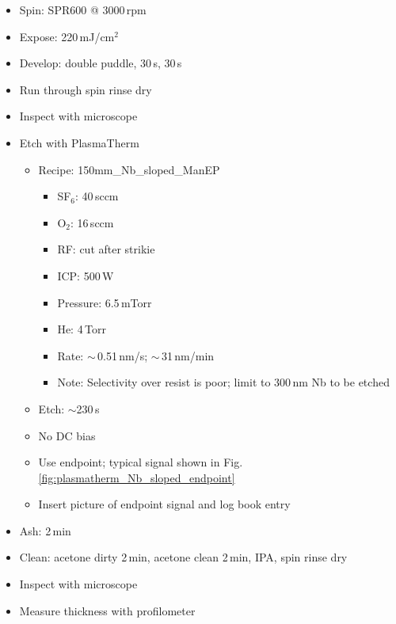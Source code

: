 \begin{itemize}
\item Spin: SPR600 @ 3000\,rpm
\item Expose: 220\,mJ/cm$^2$
\item Develop: double puddle, 30\,s, 30\,s
\item Run through spin rinse dry
\item Inspect with microscope
\item Etch with PlasmaTherm
\begin{itemize}
\item Recipe: 150mm\_Nb\_sloped\_ManEP
\begin{itemize}
\item SF$_6$: 40\,sccm
\item O$_2$: 16\,sccm
\item RF: cut after strikie
\item ICP: 500\,W
\item Pressure: 6.5\,mTorr
\item He: 4\,Torr
\item Rate: $\sim$\,0.51\,nm/s; $\sim$\,31\,nm/min
\item Note: Selectivity over resist is poor; limit to 300\,nm Nb to be etched
\end{itemize}
\item Etch: $\sim$230\,s
\item No DC bias
\item Use endpoint; typical signal shown in Fig.\,\ref{fig:plasmatherm_Nb_sloped_endpoint}
\item Insert picture of endpoint signal and log book entry
\end{itemize}
\item Ash: 2\,min
\item Clean: acetone dirty 2\,min, acetone clean 2\,min, IPA, spin rinse dry
\item Inspect with microscope
\item Measure thickness with profilometer
\end{itemize}



